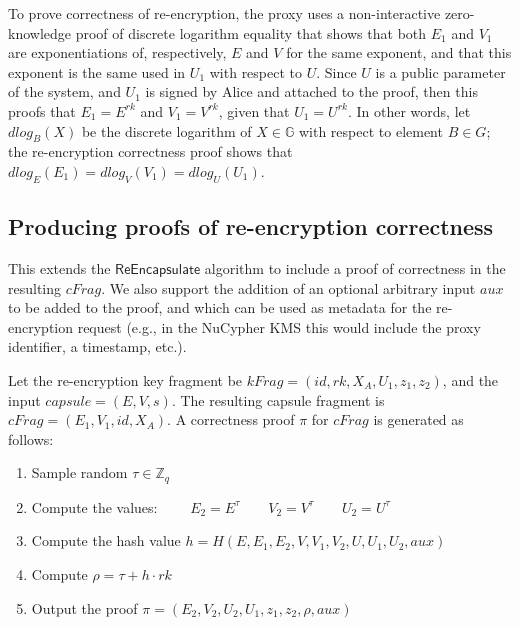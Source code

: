 \documentclass{amsart}
\newcommand{\G}{\mathbb G}
\begin{document}

To prove correctness of re-encryption, the proxy uses a non-interactive zero-knowledge proof of discrete logarithm equality that shows that both $E_1$ and $V_1$ are exponentiations of, respectively, $E$ and $V$ for the same exponent, and that this exponent is the same used in $U_1$ with respect to $U$. Since $U$ is a public parameter of the system, and $U_1$ is signed by Alice and attached to the proof, then this proofs that $E_1 = E^{rk}$ and $V_1 = V^{rk}$, given that $U_1 = U^{rk}$. In other words, let $dlog_B(X)$ be the discrete logarithm of $X \in \G$ with respect to element $B \in G$; the re-encryption correctness proof shows that $dlog_E(E_1) = dlog_V(V_1) = dlog_U(U_1)$. 

\subsection{Producing proofs of re-encryption correctness}

This extends the $\mathsf{ReEncapsulate}$ algorithm to include a proof of correctness in the resulting $cFrag$. We also support the addition of an optional arbitrary input $aux$ to be added to the proof, and which can be used as metadata for the re-encryption request (e.g., in the NuCypher KMS this would include the proxy identifier, a timestamp, etc.). 

Let the re-encryption key fragment be $kFrag= (id, rk, X_A, U_1, z_1, z_2)$, and the input $capsule = (E,V,s)$. The resulting capsule fragment is $cFrag = (E_1, V_1, id, X_A)$. 
A correctness proof $\pi$ for $cFrag$ is generated as follows:
 \begin{enumerate}
    \item Sample random $\tau \in \mathbb Z_q$
    \item Compute the values:
     	$\qquad E_2 = E^{\tau}	\qquad	V_2 = V^\tau	\qquad	U_2 = U^\tau$
	\item Compute the hash value $h = H(E, E_1, E_2, V, V_1, V_2, U, U_1, U_2, aux)$
	\item Compute $\rho = \tau + h\cdot rk$
	\item Output the proof $\pi = (E_2, V_2, U_2, U_1, z_1, z_2, \rho, aux)$
 \end{enumerate}
 
\end{document}
